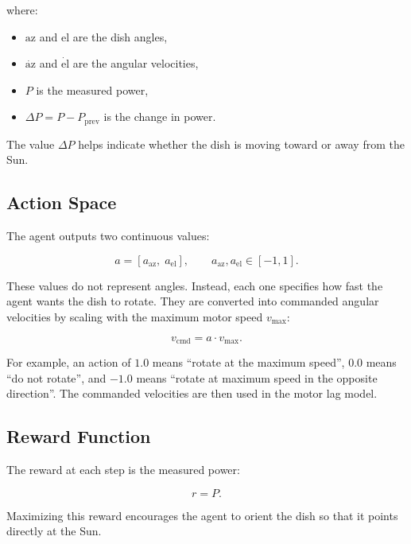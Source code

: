 \documentclass[11pt,a4paper]{article}
\begin{document}
where:
\begin{itemize}
    \item $\mathrm{az}$ and $\mathrm{el}$ are the dish angles,
    \item $\dot{\mathrm{az}}$ and $\dot{\mathrm{el}}$ are the angular velocities,
    \item $P$ is the measured power,
    \item $\Delta P = P - P_{\text{prev}}$ is the change in power.
\end{itemize}

The value $\Delta P$ helps indicate whether the dish is moving toward or away from the Sun.

\subsection{Action Space}

The agent outputs two continuous values:

\begin{equation}
a = [a_{\text{az}},\; a_{\text{el}}], \qquad a_{\text{az}}, a_{\text{el}} \in [-1, 1].
\end{equation}

These values do not represent angles.  
Instead, each one specifies how fast the agent wants the dish to rotate.  
They are converted into commanded angular velocities by scaling with the maximum motor speed $v_{\max}$:

\begin{equation}
v_{\text{cmd}} = a \cdot v_{\max}.
\end{equation}

For example, an action of $1.0$ means ``rotate at the maximum speed'',  
$0.0$ means ``do not rotate'',  
and $-1.0$ means ``rotate at maximum speed in the opposite direction''.  
The commanded velocities are then used in the motor lag model.

\subsection{Reward Function}

The reward at each step is the measured power:

\begin{equation}
r = P.
\end{equation}

Maximizing this reward encourages the agent to orient the dish so that it points directly at the Sun.
\end{document}
